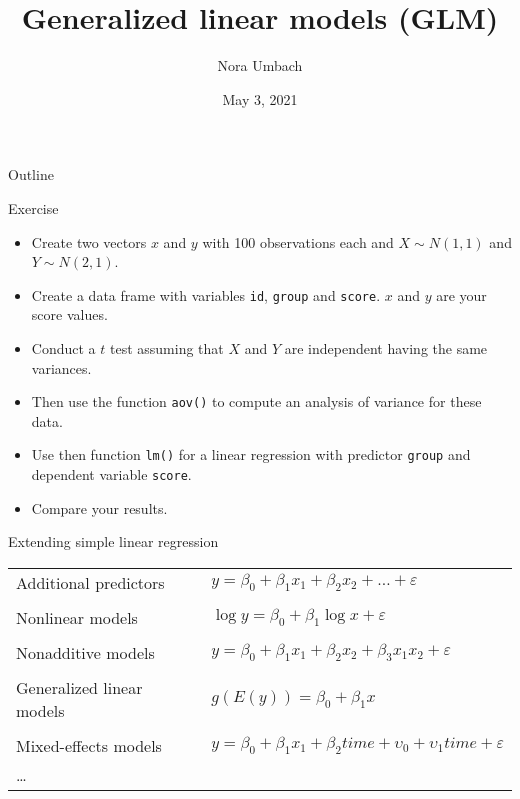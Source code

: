 \documentclass{beamer}
\title{Generalized linear models (GLM)}
\author{Nora Umbach%
}
\date{May 3, 2021}
\begin{document}
\begin{frame}{}
\thispagestyle{empty}
\titlepage
\end{frame}

\begin{frame}{Outline}
\tableofcontents
\end{frame}

\begin{frame}{}
  \begin{block}{Exercise}
    \begin{itemize}
      \item Create two vectors $x$ and $y$ with 100 observations each and
        $X \sim N(1,1)$ and $Y \sim N(2,1)$.
      \item Create a data frame with variables \texttt{id}, \texttt{group}
        and \texttt{score}. $x$ and $y$ are your score values.
      \item Conduct a $t$ test assuming that $X$ and $Y$ are independent 
        having the same variances.
      \item Then use the function \texttt{aov()} to compute an analysis of
        variance for these data.
      \item Use then function \texttt{lm()} for a linear regression with
        predictor \texttt{group} and dependent variable \texttt{score}.
      \item Compare your results.
    \end{itemize}
  \end{block}
\end{frame}

\begin{frame}{Extending simple linear regression}
  \begin{tabular}{ll}
    Additional predictors &
      $y = \beta_0 + \beta_1 x_1 + \beta_2 x_2 + \dots +
      \varepsilon$\\
      & \\
    Nonlinear models &
      $\log y = \beta_0 + \beta_1 \log x + \varepsilon$\\
      & \\
    Nonadditive models &
      $y = \beta_0 + \beta_1 x_1 + \beta_2 x_2 + \beta_3
      x_1 x_2 + \varepsilon$\\
      & \\
    Generalized linear models &
      $g(E(y)) = \beta_0 + \beta_1 x$\\
      & \\
    Mixed-effects models &
      $y = \beta_0 + \beta_1 x_1 + \beta_2 time + 
      \upsilon_0 + \upsilon_1 time + \varepsilon$\\
      \dots & \\
  \end{tabular}
\end{frame}
\end{document}
